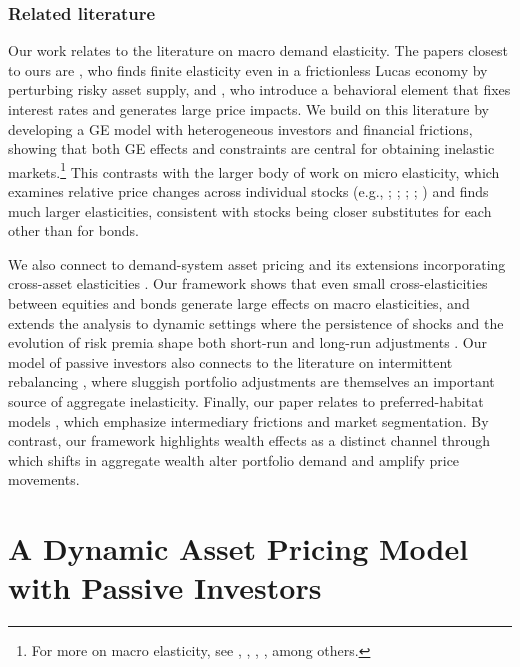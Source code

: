 \documentclass[12pt,english]{article}
\begin{document}
\subsubsection*{Related literature}
Our work relates to the literature on macro demand elasticity. The papers closest to ours are \cite{johnson2006dynamic}, who finds finite elasticity even in a frictionless Lucas economy by perturbing risky asset supply, and \cite{gabaix2020search}, who introduce a behavioral element that fixes interest rates and generates large price impacts. We build on this literature by developing a GE model with heterogeneous investors and financial frictions, showing that both GE effects and constraints are central for obtaining inelastic markets.\footnote{For more on macro elasticity, see \cite{johnson2008volume,johnson2009liquid}, \cite{Deuskar/Johnson/2011}, \cite{Li/Pearson/Zhang/2020}, \cite{Hartzmark/Solomon/2021}, among others.} This contrasts with the larger body of work on micro elasticity, which examines relative price changes across individual stocks (e.g., \citealp{Shleifer/1986}; \citealp{Harris/Gurel/1986}; \citealp{chang2015regression}; \citealp{pavlova2021benchmarking}; \citealp{Schmickler/2020}) and finds much larger elasticities, consistent with stocks being closer substitutes for each other than for bonds.

We also connect to demand-system asset pricing \citep{Koijen/Yogo/19} and its extensions incorporating cross-asset elasticities \citep{fuchs2023demand,haddad2025causal}. Our framework shows that even small cross-elasticities between equities and bonds generate large effects on macro elasticities, and extends the analysis to dynamic settings where the persistence of shocks and the evolution of risk premia shape both short-run and long-run adjustments \citep{Binsbergen-David-Opp2025,he-kondor-Li2025demand,DKLS}. Our model of passive investors also connects to the literature on intermittent rebalancing \citep{ChienColeLustig2012}, where sluggish portfolio adjustments are themselves an important source of aggregate inelasticity. Finally, our paper relates to preferred-habitat models \citep{VayanosVila2021,KekreLenelMainardi2025,RayDroste2025}, which emphasize intermediary frictions and market segmentation. By contrast, our framework highlights wealth effects as a distinct channel through which shifts in aggregate wealth alter portfolio demand and amplify price movements. 


 


\section{A Dynamic Asset Pricing Model with Passive Investors}\label{sec:model}
\end{document}
